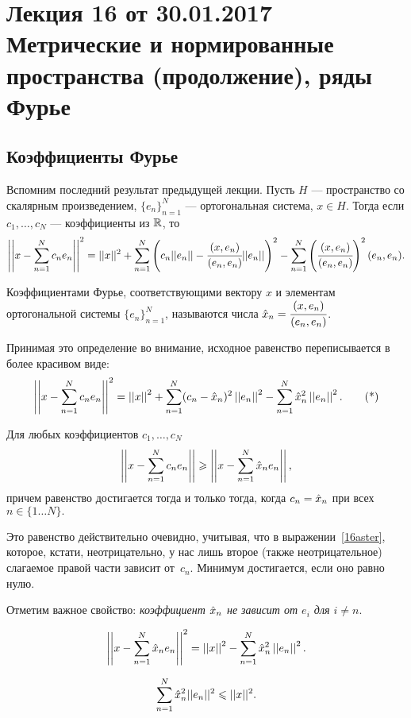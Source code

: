 \section{Лекция 16 от 30.01.2017 \\ Метрические и нормированные пространства (продолжение), ряды Фурье}
\subsection{Коэффициенты Фурье}
Вспомним последний результат предыдущей лекции. Пусть $H$ --- пространство со скалярным произведением, $\{e_n\}_{n=1}^{N}$ --- ортогональная система, $x \in H$. Тогда если $c_1, \ldots, c_N$ --- коэффициенты из $\mathbb{R}$, то 
\begin{gather*}
    \left|\left|x - \sum\limits_{n= 1}^{N}c_ne_n\right|\right|^2 = ||x||^2 +\sum\limits_{n=1}^{N}\left(c_n||e_n|| - \cfrac{(x, e_n)}{(e_n, e_n)}||e_n||\right)^2 - \sum\limits_{n =1 }^{N} \left(\cfrac{(x, e_n)}{(e_n, e_n)}\right)^2(e_n, e_n).
\end{gather*}
\begin{Def}
    Коэффициентами Фурье, соответствующими вектору $x$ и элементам ортогональной системы $\{e_n\}_{n=1}^{N}$, называются числа $\hat{x}_n = \cfrac{(x, e_n)}{(e_n, e_n)}$.
\end{Def}
Принимая это определение во внимание, исходное равенство переписывается в более красивом виде:
\[
    \left|\left|x - \sum\limits_{n= 1}^{N}c_ne_n\right|\right|^2 = \left|\left|x\right|\right|^2 + \sum\limits_{n=1}^{N}(c_n - \hat{x}_n)^2 \left|\left|e_n\right|\right|^2 - \sum\limits_{n =1}^{N}\hat{x}_n^2 
    \left|\left|e_n\right|\right|^2. \tag{*}\label{16aster}
\]
\begin{Statement}[очевидное]
    Для любых коэффициентов $c_1, \ldots, c_N$
    $$
        \left|\left| x - \sum\limits_{n=1}^{N}c_n e_n\right|\right|\geqslant \left|\left|x -  \sum\limits_{n=1}^{N}\hat{x}_n e_n\right|\right|,
    $$
    причем равенство достигается тогда и только тогда, когда $c_n = \hat{x}_n$ при всех $n\in \{1\dots N\}.$
\end{Statement}
Это равенство действительно очевидно, учитывая, что в выражении~\eqref{16aster}, которое, кстати, неотрицательно, у нас лишь второе (также неотрицательное) слагаемое правой части зависит от~$c_n$. Минимум достигается, если оно равно нулю.

Отметим важное свойство: \textit{коэффициент $\hat{x}_n$ не зависит от $e_i$ для $i \neq n$}.
\begin{Statement}
    $$
        \left|\left|x - \sum\limits_{n=1}^{N}\hat{x}_ne_n\right|\right|^2 = \left|\left|x\right|\right|^2 - \sum\limits_{n=1}^{N} \hat{x}_n^2 \left|\left|e_n\right|\right|^2.
    $$
\end{Statement}
\begin{Consequence}
    $$\sum\limits_{n=1}^{N} \hat{x}_n^2||e_n||^2\leqslant ||x||^2.$$
\end{Consequence}

